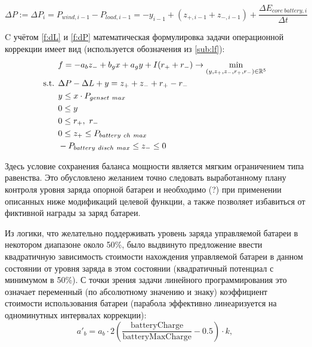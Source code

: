         \begin{equation}
        \label{f:dP}
        \Delta P := \Delta P_i =  
        P_{wind, i-1} - P_{load, i-1} 
        = -y_{i-1}  + (z_{+, i-1} + z_{-, i-1})
        + \frac{\Delta E_{core~battery, i}}{\Delta t} 
        \end{equation}
        
        C учётом \ref{f:dL} и \ref{f:dP} математическая формулировка задачи операционной коррекции имеет вид (используется обозначения из \ref{sub:lf}):
 \begin{equation}\label{f:lf}
\begin{split}
\vspace{-4mm}
&f =  -a_b z_- + b_g x + a_g y + I(r_+ + r_-)
\rightarrow \min\limits_{(y, z_+, z_-, r_+, r_-) \in \R^5 }\\
\text{s.t. }& \Delta P - \Delta L + y = z_+ + z_- + r_+ - r_- \\
&y \leq x \cdot P_{genset~max}\\
&0 \leq y \\
&0 \leq r_+,~r_- \\
&0 \leq z_+ \leq P_{battery~ch~max} \\
&-P_{battery~disch~max} \leq z_- \leq 0 \\
\end{split}
\end{equation} 

Здесь условие сохранения баланса мощности является мягким ограничением типа равенства.
Это обусловлено желанием точно следовать выработанному плану контроля уровня заряда опорной батареи и необходимо (?) при применении описанных ниже модификаций целевой функции, а также позволяет избавиться от фиктивной награды за заряд батареи.

Из логики, что желательно поддерживать уровень заряда управляемой батареи в некотором диапазоне около 50\%, было выдвинуто предложение
ввести квадратичную зависимость стоимости нахождения управляемой батареи в данном состоянии от уровня заряда в этом состоянии (квадратичный потенциал с минимумом в 50\%).
С точки зрения задачи линейного программирования это означает переменный (по абсолютному значению и знаку) коэффициент стоимости использования батареи (парабола эффективно линеаризуется на одноминутных интервалах коррекции):
\begin{equation}
    a'_b = a_b \cdot 2 \left(\frac{\text{batteryCharge}}{\text{batteryMaxCharge}} - 0.5\right) \cdot k,
\end{equation}

